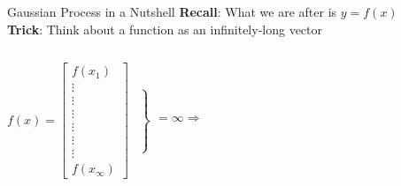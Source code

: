 \documentclass[pdf]{beamer}
\begin{document}
\begin{frame}{Gaussian Process in a Nutshell}
\vspace{-0.2cm}
\textbf{Recall}: What we are after is $y = f(x)$\\
\vspace{0.3cm}
\textbf{Trick}: Think about a function as an infinitely-long vector 
\begin{columns}
	$f(x) =
	\left[
	\begin{array}{c}
	f(x_1) \\ \vdots \\ \vdots \\ \vdots \\ \vdots \\ \vdots \\ \vdots \\ f(x_\infty)
	\end{array}
	\right]
	\left.
	\begin{array}{c}
	 \\  \\  \\  \\  \\  \\  \\ \\  \\ \\ \\ %
	\end{array}
	\right\}
	\begin{array}{c}
	 \\  \\  \\  \\ \\ =\infty \Longrightarrow \\  \\ \\  \\ \\ \\ %
	\end{array}
	$

\end{columns}
\end{frame}
\end{document}
